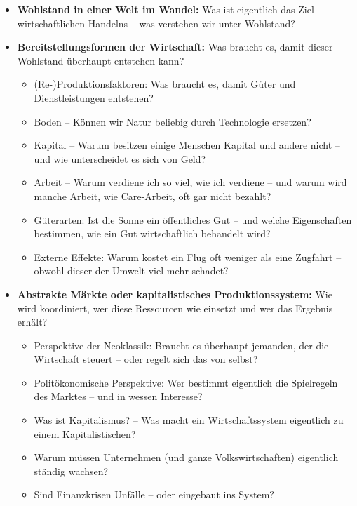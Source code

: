 \documentclass[
  nswissgerman,
  a4paper,
  DIV=11,
  numbers=noendperiod,
  oneside,
  openany]{scrreprt}
\begin{document}
\begin{itemize}
\item
  \textbf{Wohlstand in einer Welt im Wandel:} Was ist eigentlich das
  Ziel wirtschaftlichen Handelns -- was verstehen wir unter Wohlstand?
\item
  \textbf{Bereitstellungsformen der Wirtschaft:} Was braucht es, damit
  dieser Wohlstand überhaupt entstehen kann?

  \begin{itemize}
  \item
    (Re-)Produktionsfaktoren: Was braucht es, damit Güter und
    Dienstleistungen entstehen?
  \item
    Boden -- Können wir Natur beliebig durch Technologie ersetzen?
  \item
    Kapital -- Warum besitzen einige Menschen Kapital und andere nicht
    -- und wie unterscheidet es sich von Geld?
  \item
    Arbeit -- Warum verdiene ich so viel, wie ich verdiene -- und warum
    wird manche Arbeit, wie Care-Arbeit, oft gar nicht bezahlt?
  \item
    Güterarten: Ist die Sonne ein öffentliches Gut -- und welche
    Eigenschaften bestimmen, wie ein Gut wirtschaftlich behandelt wird?
  \item
    Externe Effekte: Warum kostet ein Flug oft weniger als eine Zugfahrt
    -- obwohl dieser der Umwelt viel mehr schadet?
  \end{itemize}
\item
  \textbf{Abstrakte Märkte oder kapitalistisches Produktionssystem:} Wie
  wird koordiniert, wer diese Ressourcen wie einsetzt und wer das
  Ergebnis erhält?

  \begin{itemize}
  \item
    Perspektive der Neoklassik: Braucht es überhaupt jemanden, der die
    Wirtschaft steuert -- oder regelt sich das von selbst?
  \item
    Politökonomische Perspektive: Wer bestimmt eigentlich die
    Spielregeln des Marktes -- und in wessen Interesse?
  \item
    Was ist Kapitalismus? -- Was macht ein Wirtschaftssystem eigentlich
    zu einem Kapitalistischen?
  \item
    Warum müssen Unternehmen (und ganze Volkswirtschaften) eigentlich
    ständig wachsen?
  \item
    Sind Finanzkrisen Unfälle -- oder eingebaut ins System?
  \end{itemize}
\end{itemize}
\end{document}
